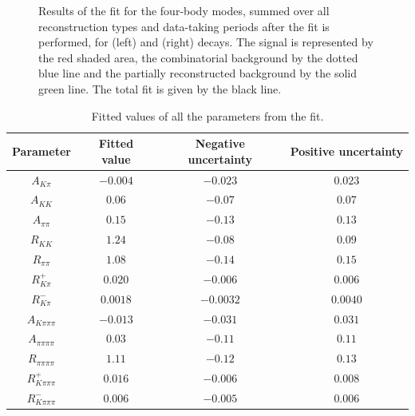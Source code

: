 \begin{figure}
\caption{Results of the \CP fit for the four-body modes, summed over all \KS reconstruction types and data-taking periods after the fit is performed, for \Bp (left) and \Bm (right) decays. The signal is represented by the red shaded area, the combinatorial background by the dotted blue line and the partially reconstructed background by the solid green line. The total fit is given by the black line.}
\label{results4body}
\end{figure}

\begin{table}[h]
\centering
{\footnotesize
\begin{tabular}{c|ccc}
\hline
Parameter & Fitted value & Negative uncertainty & Positive uncertainty \\
\hline
$A_{K\pi}$ & $-0.004$ & $-0.023$ & $0.023$ \\
$A_{KK}$ & $0.06$ & $-0.07$ & $0.07$ \\
$A_{\pi\pi}$ & $0.15$ & $-0.13$ & $0.13$ \\
$R_{KK}$ & $1.24$ & $-0.08$ & $0.09$ \\
$R_{\pi\pi}$ & $1.08$ & $-0.14$ & $0.15$ \\
$R^+_{K\pi}$ & $0.020$ & $-0.006$ & $0.006$ \\
$R^-_{K\pi}$ & $0.0018$ & $-0.0032$ & $0.0040$ \\
$A_{K\pi\pi\pi}$ & $-0.013$ & $-0.031$ & $0.031$ \\
$A_{\pi\pi\pi\pi}$ & $0.03$ & $-0.11$ & $0.11$ \\
$R_{\pi\pi\pi\pi}$ & $1.11$ & $-0.12$ & $0.13$ \\
$R^+_{K\pi\pi\pi}$ & $0.016$ & $-0.006$ & $0.008$ \\
$R^-_{K\pi\pi\pi}$ & $0.006$ & $-0.005$ & $0.006$ \\
\hline
\end{tabular}}
\caption{Fitted values of all the \CP parameters from the \CP fit.}
\label{cpfitresultsphysics}
\end{table}

